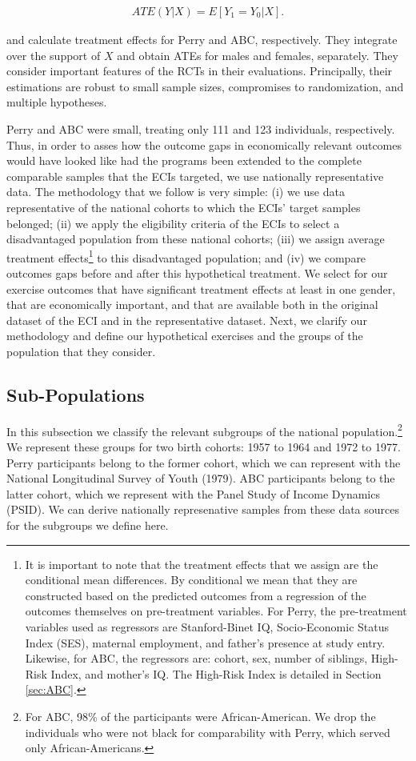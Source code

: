 \begin{eqnarray*}
ATE(Y|X) = E[Y_1 = Y_0 | X].
\end{eqnarray*}

\noindent \citet{heckman2010analyzing} and \citet{Frances_2013_EJ} calculate treatment effects for Perry and ABC, respectively. They integrate over the support of $X$ and obtain ATEs for males and females, separately. They consider important features of the RCTs in their evaluations. Principally, their estimations are robust to small sample sizes, compromises to randomization, and multiple hypotheses.

Perry and ABC were small, treating only 111 and 123 individuals, respectively. Thus, in order to asses how the outcome gaps in economically relevant outcomes would have looked like had the programs been extended to the complete comparable samples that the ECIs targeted, we use nationally representative data. The methodology that we follow is very simple:  (i) we use data representative of the national cohorts to which the ECIs' target samples belonged; (ii) we apply the eligibility criteria of the ECIs to select a disadvantaged population from these national cohorts; (iii) we assign average treatment effects\footnote{It is important to note that the treatment effects that we assign are the conditional mean differences. By conditional we mean that they are constructed based on the predicted outcomes from a regression of the outcomes themselves on pre-treatment variables. For Perry, the pre-treatment variables used as regressors are Stanford-Binet IQ, Socio-Economic Status Index (SES), maternal employment, and father's presence at study entry. Likewise, for ABC, the regressors are: cohort, sex, number of siblings, High-Risk Index, and mother's IQ. The High-Risk Index is detailed in Section \ref{sec:ABC}.} to this disadvantaged population; and (iv) we compare outcomes gaps before and after this hypothetical treatment. We select for our exercise outcomes that have significant treatment effects at least in one gender, that are economically important, and that are available both in the original dataset of the ECI and in the representative dataset. Next, we clarify our methodology and define our hypothetical exercises and the groups of the population that they consider.

\subsection{Sub-Populations}
In this subsection we classify the relevant subgroups of the national population.\footnote{For ABC, 98\% of the participants were African-American. We drop the individuals who were not black for comparability with Perry, which served only African-Americans.} We represent these groups for two birth cohorts: 1957 to 1964 and 1972 to 1977. Perry participants belong to the former cohort, which we can represent with the National Longitudinal Survey of Youth (1979). ABC participants belong to the latter cohort, which we represent with the Panel Study of Income Dynamics (PSID). We can derive nationally represenative samples from these data sources for the subgroups we define here. 

